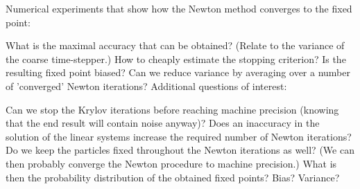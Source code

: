 

Numerical experiments that show how the Newton method converges to the fixed point:

What is the maximal accuracy that can be obtained? (Relate to the variance of the coarse time-stepper.) How to cheaply estimate the stopping criterion?
Is the resulting fixed point biased?
Can we reduce variance by averaging over a number of 'converged' Newton iterations?
Additional questions of interest:

Can we stop the Krylov iterations before reaching machine precision (knowing that the end result will contain noise anyway)? Does an inaccuracy in the solution of the linear systems increase the required number of Newton iterations?
Do we keep the particles fixed throughout the Newton iterations as well? (We can then probably converge the Newton procedure to machine precision.) What is then the probability distribution of the obtained fixed points? Bias? Variance?